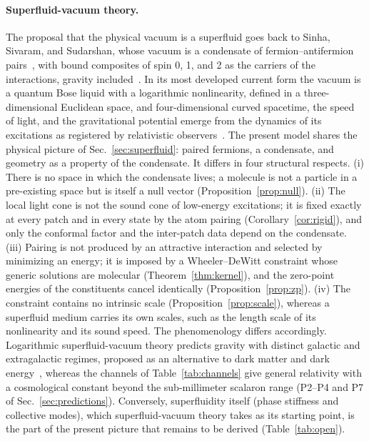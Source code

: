 \documentclass[reprint,aps,prd,amsmath,amssymb,superscriptaddress,nofootinbib,floatfix]{revtex4-2}
\theoremstyle{plain}
\theoremstyle{definition}
\theoremstyle{remark}
\begin{document}
\paragraph*{Superfluid-vacuum theory.} The proposal that the physical vacuum is a superfluid goes back to Sinha, Sivaram,
and Sudarshan, whose vacuum is a condensate of fermion--antifermion pairs~\cite{SinhaSivaramSudarshan1976}, with bound
composites of spin 0, 1, and 2 as the carriers of the interactions, gravity included~\cite{SinhaSudarshan1978}. In its most
developed current form the vacuum is a quantum Bose liquid with a logarithmic nonlinearity, defined in a
three-dimensional Euclidean space, and four-dimensional curved spacetime, the speed of light, and the gravitational
potential emerge from the dynamics of its excitations as registered by relativistic
observers~\cite{Zloshchastiev2020,Zloshchastiev2023}. The present
model shares the physical picture of Sec.~\ref{sec:superfluid}: paired fermions, a condensate, and geometry as a property of
the condensate. It differs in four structural respects. (i) There is no space in which the condensate lives; a molecule is
not a particle in a pre-existing space but is itself a null vector (Proposition~\ref{prop:null}). (ii) The local light cone
is not the sound cone of low-energy excitations; it is fixed exactly at every patch and in every state by the atom pairing
(Corollary~\ref{cor:rigid}), and only the conformal factor and the inter-patch data depend on the condensate. (iii) Pairing
is not produced by an attractive interaction and selected by minimizing an energy; it is imposed by a Wheeler--DeWitt
constraint whose generic solutions are molecular (Theorem~\ref{thm:kernel}), and the zero-point energies of the constituents
cancel identically (Proposition~\ref{prop:zp}). (iv) The constraint contains no intrinsic scale (Proposition~\ref{prop:scale}),
whereas a superfluid medium carries its own scales, such as the length scale of its nonlinearity and its sound speed. The phenomenology differs
accordingly. Logarithmic superfluid-vacuum theory predicts gravity with distinct galactic and extragalactic regimes,
proposed as an alternative to dark matter and dark energy~\cite{Zloshchastiev2020}, whereas the channels of
Table~\ref{tab:channels} give general relativity with a cosmological constant beyond the sub-millimeter scalaron range
(P2--P4 and P7 of Sec.~\ref{sec:predictions}). Conversely, superfluidity itself (phase stiffness and collective modes), which
superfluid-vacuum theory takes as its starting point, is the part of the present picture that remains to be derived
(Table~\ref{tab:open}).
\end{document}
